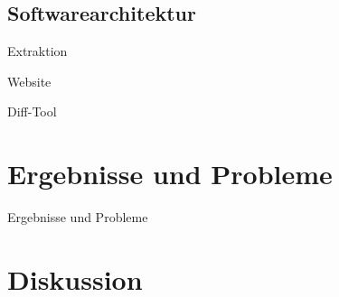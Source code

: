 \documentclass[halfparskip]{beamer}
\begin{document}
\subsection{Softwarearchitektur}
\begin{frame}{Extraktion}
	
\end{frame}
\begin{frame}{Website}
	
\end{frame}
\begin{frame}{Diff-Tool}
	
\end{frame}

\section{Ergebnisse und Probleme}
\begin{frame}{Ergebnisse und Probleme}
	
\end{frame}

\section{Diskussion}
\end{document}
